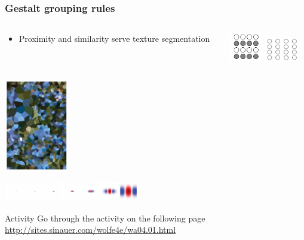 \documentclass[]{beamer}
\begin{document}
\begin{frame}
\frametitle{Gestalt grouping rules}
\begin{overlayarea}{110mm}{80mm}
\begin{columns}[T]
\begin{column}{70mm}
\begin{center}
 \begin{itemize}
\setlength{\itemsep}{50pt}
 \item Proximity and similarity serve texture segmentation
\end{itemize}
\end{center}
\end{column}

 \begin{column}{30mm}
\begin{center}
\vspace{3mm}
\includegraphics[width=15mm]{figs/l5/gestalt_similarity.png}
\includegraphics[width=15mm]{figs/l5/gestalt_proximity.png}
\end{center}
 \end{column}
\end{columns}
\begin{center}
\includegraphics[height=40mm]{figs/l5/texture_segmentation.png}

\includegraphics[width=60mm]{figs/l5/odog_scales.png}
\end{center}
\end{overlayarea}
\end{frame}


\begin{frame}
\begin{block}{Activity}
Go through the activity on the following page \url{http://sites.sinauer.com/wolfe4e/wa04.01.html}
\end{block}
\end{frame}
\end{document}
